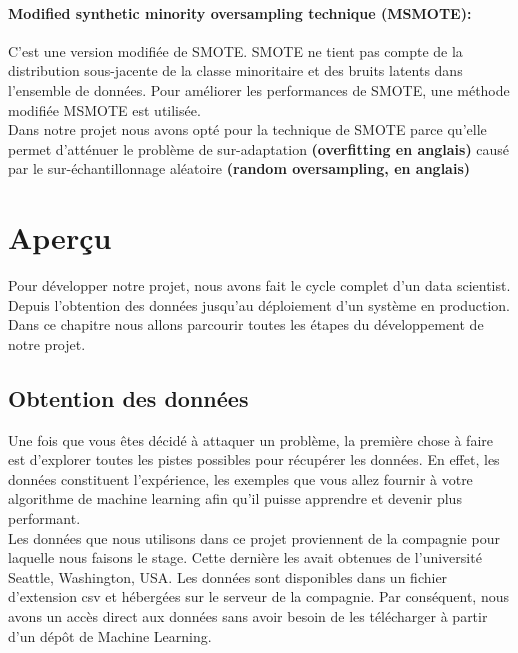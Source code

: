 \documentclass[12pt, french]{article}
\begin{document}
\paragraph{Modified synthetic minority oversampling technique (MSMOTE):}
C'est une version modifiée de SMOTE. SMOTE ne tient pas compte de la distribution sous-jacente de la classe minoritaire et des bruits latents dans l'ensemble de données. Pour améliorer les performances de SMOTE, une méthode modifiée MSMOTE est utilisée.\\

Dans notre projet nous avons opté pour la technique de SMOTE parce qu'elle permet d'atténuer le problème de sur-adaptation \textbf{(overfitting en anglais)} causé par le sur-échantillonnage aléatoire \textbf{(random oversampling, en anglais)}
 




%
%
%
%
%







\newpage

\section{Aperçu}
Pour développer notre projet, nous avons fait le cycle complet d'un data scientist. Depuis l'obtention des données jusqu'au déploiement d'un système en production. Dans ce chapitre nous allons parcourir toutes les étapes du développement de notre projet. 

\subsection{Obtention des données}
Une fois que vous êtes décidé à attaquer un problème, la première chose à faire est d'explorer toutes les pistes possibles pour récupérer les données. En effet, les données constituent l'expérience, les exemples que vous allez fournir à votre algorithme de machine learning afin qu'il puisse apprendre et devenir plus performant.\\ 
Les données que nous utilisons dans ce projet proviennent de la compagnie pour laquelle nous faisons le stage. Cette dernière les avait obtenues de l'université Seattle, Washington, USA. Les données sont disponibles dans un fichier d'extension csv et hébergées sur le serveur de la compagnie. Par conséquent, nous avons un accès direct aux données sans avoir besoin de les télécharger à partir d'un dépôt de Machine Learning.
\end{document}
